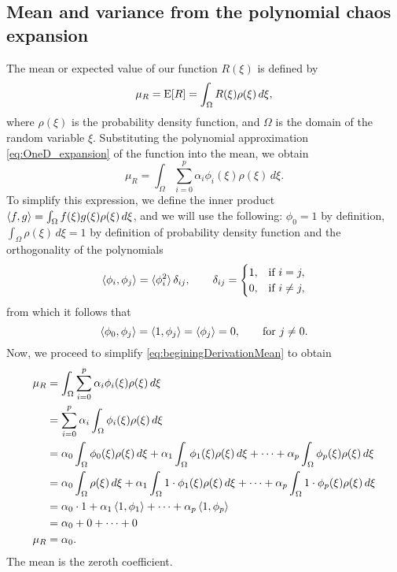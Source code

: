 \subsection{Mean and variance from the polynomial chaos expansion}
\label{sec:1dStatistics}
The mean or expected value of our function $R(\xi)$ is defined by
\begin{equation}
	\mu_R = \mathrm{E}[R] = \int_\Omega R(\xi) \rho(\xi)\, d\xi,
  \label{eq:meanDef}
\end{equation}
where $\rho(\xi)$ is the probability density function, and $\Omega$ is the domain of the random variable $\xi$.
Substituting the polynomial approximation \cref{eq:OneD_expansion} of the function into the mean, we obtain
\begin{equation}
  \mu_R = \int_\Omega \sum_{i=0}^p \alpha_i \phi_i(\xi) \rho(\xi)\, d\xi.
  \label{eq:beginingDerivationMean}
\end{equation}
To simplify this expression, we define the inner product $\braket{f, g} = \int_\Omega f(\xi)g(\xi)\rho(\xi)\, d\xi $, and we will use the following: $\phi_0 = 1$ by definition, $ \int_\Omega \rho(\xi)\, d\xi = 1 $ by definition of probability density function and the orthogonality of the polynomials
\begin{equation}
  \braket{\phi_i, \phi_j} = \braket{\phi_i^2}\delta_{ij}, \qquad \delta_{ij} =
	\begin{cases}
	1, &         \text{if } i=j,\\
	0, &         \text{if } i\neq j,
	\end{cases}
\end{equation}
from which it follows that
\begin{equation}
  \braket{\phi_0, \phi_j} = \braket{1, \phi_j} = \braket{\phi_j} = 0, \qquad \text{for } j\neq0.
\end{equation}
Now, we proceed to simplify \cref{eq:beginingDerivationMean} to obtain
\begin{align}
  \mu_R & = \int_\Omega \sum_{i=0}^p \alpha_i \phi_i(\xi) \rho(\xi)\, d\xi \\
	& = \sum_{i=0}^p \alpha_i \int_\Omega \phi_i(\xi) \rho(\xi)\, d\xi \\
  & = \alpha_0 \int_\Omega \phi_0(\xi) \rho(\xi)\, d\xi + \alpha_1 \int_\Omega \phi_1(\xi) \rho(\xi)\, d\xi + \cdots + \alpha_p \int_\Omega \phi_p(\xi) \rho(\xi)\, d\xi \\
  & = \alpha_0 \int_\Omega \rho(\xi)\, d\xi + \alpha_1 \int_\Omega 1\cdot\phi_1(\xi) \rho(\xi)\, d\xi + \cdots + \alpha_p \int_\Omega 1\cdot\phi_p(\xi) \rho(\xi)\, d\xi \\
  & = \alpha_0\cdot 1 + \alpha_1 \braket{1,\phi_1} + \cdots + \alpha_p \braket{1,\phi_p} \\
  & = \alpha_0 + 0 + \cdots + 0 \\
  \mu_R & = \alpha_0.
  \label{eq:PCmean}
\end{align}
The mean is the zeroth coefficient.

